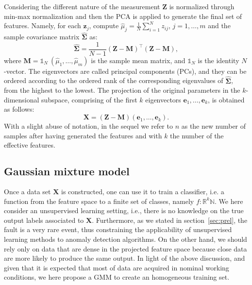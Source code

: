  Considering the different nature of the measurement $\mathbf{Z}$ is normalized through min-max normalization and then the PCA is applied to generate the final set of features. Namely, for each $\mathbf{z}_j$, compute $\hat{\mu}_{j}=\frac{1}{N} \sum_{i=1}^{N} z_{i j}$, $j=1,\dots, m$ and the sample covariance matrix $\hat{\mathbf{\Sigma}}$ as:
\begin{equation}
    \label{eqn: covMat}
    \hat{\mathbf{\Sigma}}=\frac{1}{N-1}(\mathbf{Z}-\mathbf{M})^{\top}(\mathbf{Z}-\mathbf{M}),
\end{equation}
where $\mathbf{M} = \mathbb{1}_{N}~(\hat{\mu}_1, \dots, \hat{\mu}_m)$ is the sample mean matrix, and $\mathbb{1}_N$ is the identity $N$-vector. The eigenvectors are called principal components (PCs), and they can be ordered according to the ordered rank of the corresponding eigenvalues of $\hat{\mathbf{\Sigma}}$, from the highest to the lowest. The projection of the original parameters in the $k$-dimensional subspace, comprising of the first $k$ eigenvectors $\mathbf{e}_{1}, \ldots, \mathbf{e}_{k}$, is obtained as follows:
\begin{equation}
    \label{eqn: pca}
    \mathbf{X}=(\mathbf{Z}-\mathbf{M}) \left(\mathbf{e}_{1}, \ldots, \mathbf{e}_{k}\right).
\end{equation}
With a slight abuse of notation, in the sequel we refer to $n$ as the new number of samples after having generated the features and with $k$ the number of the effective features. 


\subsection{Gaussian mixture model}
Once a data set $\mathbf{X}$ is constructed, one can use it to train a classifier, i.e. a function from the feature space to a finite set of classes, namely $f : \mathbb{R}^k  \mathbb{N}$. We here consider an unsupervised learning setting, i.e., there is no knowledge on the true output labels associated to $\mathbf{X}$. Furthermore, as we stated in section~\ref{sec:prel}, the fault is a very rare event, thus constraining the applicability of unsupervised learning methods to anomaly detection algorithms. On the other hand, we should rely only on data that are dense in the projected feature space because close data are more likely to produce the same output. In light of the above discussion, and given that it is expected that most of data are acquired in nominal working conditions, we here propose a GMM to create an homogeneous training set.

